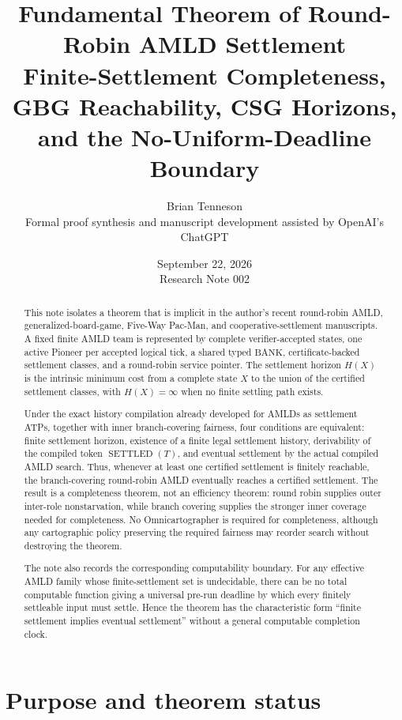 \documentclass[11pt]{article}
\title{\textbf{Fundamental Theorem of Round-Robin AMLD Settlement}\\[0.25em]
\large Finite-Settlement Completeness, GBG Reachability, CSG Horizons,\\
and the No-Uniform-Deadline Boundary}
\author{Brian Tenneson\\[1mm]
\small Formal proof synthesis and manuscript development assisted by OpenAI's ChatGPT}
\date{September 22, 2026\\Research Note 002}
\theoremstyle{remark}
\newcommand{\BANK}{\ensuremath{\mathrm{BANK}}}
\newcommand{\Sett}{\operatorname{SETTLED}}
\begin{document}
\maketitle

\begin{abstract}
This note isolates a theorem that is implicit in the author's recent round-robin AMLD, generalized-board-game, Five-Way Pac-Man, and cooperative-settlement manuscripts.  A fixed finite AMLD team is represented by complete verifier-accepted states, one active Pioneer per accepted logical tick, a shared typed \BANK, certificate-backed settlement classes, and a round-robin service pointer.  The settlement horizon $H(X)$ is the intrinsic minimum cost from a complete state $X$ to the union of the certified settlement classes, with $H(X)=\infty$ when no finite settling path exists.

Under the exact history compilation already developed for AMLDs as settlement ATPs, together with inner branch-covering fairness, four conditions are equivalent: finite settlement horizon, existence of a finite legal settlement history, derivability of the compiled token $\Sett(T)$, and eventual settlement by the actual compiled AMLD search.  Thus, whenever at least one certified settlement is finitely reachable, the branch-covering round-robin AMLD eventually reaches a certified settlement.  The result is a completeness theorem, not an efficiency theorem: round robin supplies outer inter-role nonstarvation, while branch covering supplies the stronger inner coverage needed for completeness.  No Omnicartographer is required for completeness, although any cartographic policy preserving the required fairness may reorder search without destroying the theorem.

The note also records the corresponding computability boundary.  For any effective AMLD family whose finite-settlement set is undecidable, there can be no total computable function giving a universal pre-run deadline by which every finitely settleable input must settle.  Hence the theorem has the characteristic form ``finite settlement implies eventual settlement'' without a general computable completion clock.
\end{abstract}

\section{Purpose and theorem status}
\end{document}
